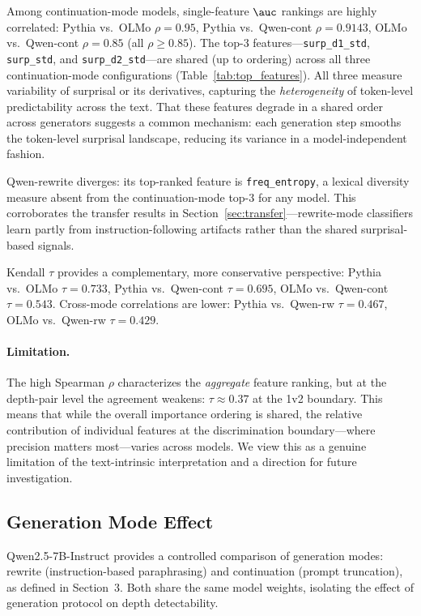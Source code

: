 Among continuation-mode models, single-feature $\auc$ rankings
are highly correlated:
Pythia vs.\ OLMo $\rho = 0.95$,
Pythia vs.\ Qwen-cont $\rho = 0.9143$,
OLMo vs.\ Qwen-cont $\rho = 0.85$
(all $\rho \geq 0.85$).
The top-3 features---\texttt{surp\_d1\_std}, \texttt{surp\_std},
and \texttt{surp\_d2\_std}---are shared (up to ordering) across
all three continuation-mode configurations
(Table~\ref{tab:top_features}).
All three measure variability of surprisal or its derivatives,
capturing the \emph{heterogeneity} of token-level predictability
across the text.
That these features degrade in a shared order across generators
suggests a common mechanism: each generation step smooths the
token-level surprisal landscape, reducing its variance in a
model-independent fashion.

Qwen-rewrite diverges: its top-ranked feature is
\texttt{freq\_entropy}, a lexical diversity measure absent from
the continuation-mode top-3 for any model.
This corroborates the transfer results in
Section~\ref{sec:transfer}---rewrite-mode classifiers learn
partly from instruction-following artifacts rather than the
shared surprisal-based signals.

Kendall $\tau$ provides a complementary, more conservative
perspective:
Pythia vs.\ OLMo $\tau = 0.733$,
Pythia vs.\ Qwen-cont $\tau = 0.695$,
OLMo vs.\ Qwen-cont $\tau = 0.543$.
Cross-mode correlations are lower:
Pythia vs.\ Qwen-rw $\tau = 0.467$,
OLMo vs.\ Qwen-rw $\tau = 0.429$.

\paragraph{Limitation.}
The high Spearman $\rho$ characterizes the \emph{aggregate}
feature ranking, but at the depth-pair level the agreement
weakens: $\tau \approx 0.37$ at the 1v2 boundary.
This means that while the overall importance ordering is shared,
the relative contribution of individual features at the
discrimination boundary---where precision matters most---varies
across models.
We view this as a genuine limitation of the text-intrinsic
interpretation and a direction for future investigation.

\subsection{Generation Mode Effect}
\label{sec:generation_mode}

Qwen2.5-7B-Instruct provides a controlled comparison of generation
modes: rewrite (instruction-based paraphrasing) and continuation
(prompt truncation), as defined in Section~3.
Both share the same model weights, isolating the effect of
generation protocol on depth detectability.

